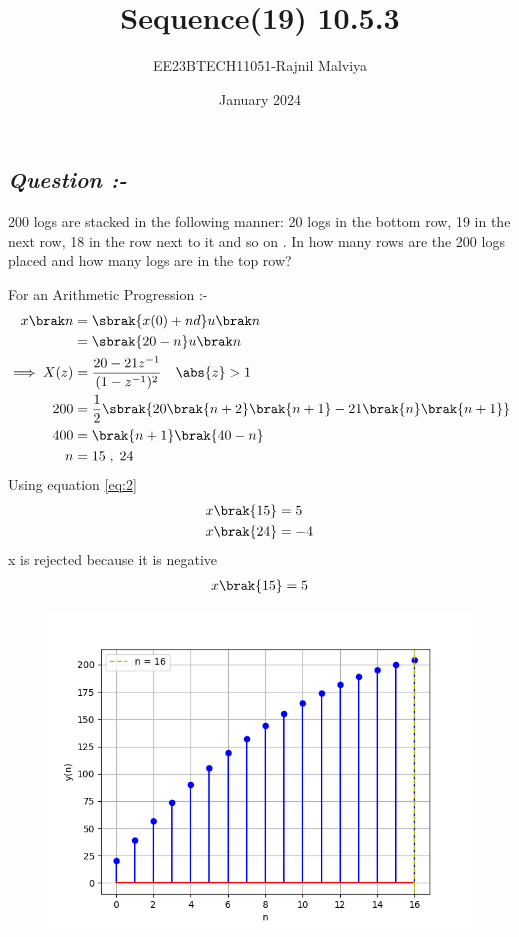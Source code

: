 \documentclass[journal,12pt,twocolumn]{IEEEtran}
\theoremstyle{remark}
\begin{document}
\title{Sequence(19) 10.5.3}
\author{EE23BTECH11051-Rajnil Malviya}
\date{January 2024}
\maketitle
\subsection*{\textit{Question :-}}
200 logs are stacked in the following manner: 20 logs in the bottom row, 19 in the next row,
18 in the row next to it and so on . In how many rows are the 200 logs placed
and how many logs are in the top row?
\fi
\begin{table}[h!]
            
    \end{table}
For an Arithmetic Progression :-
\begin{align}x\brak n&=\sbrak {x(0)+n d} u \brak n \label{eq:1}\\
&=\sbrak{20-n} u \brak n \label{eq:2}\\
 \implies X(z)&=\frac{20-21z^{-1}}{(1 - z^{-1})^2}  \quad \abs{ z} > 1 \label{eq:3}\\
  200 &=\frac{1}{2}\sbrak{20\brak{n+2}\brak{n+1}-21\brak{n}\brak{n+1}} \label{eq:4}\\
  400&=\brak{n+1} \brak{40-n} \label{eq:5}\\
   n & =15\; ,\;24 \label{eq:6}
 \end{align}
Using equation \eqref{eq:2}
\begin{align} &x\brak{15}=5 \label{eq:7}\\
 &x\brak{24}=-4 \label{eq:8} \end{align}
x is rejected because it is negative
\begin{align}x\brak{15}=5\end{align}
\begin{figure}
   \includegraphics[width=1\linewidth]{ncert-maths/10/5/3/19/figs/f2.png}
\end{figure}
\end{document}
